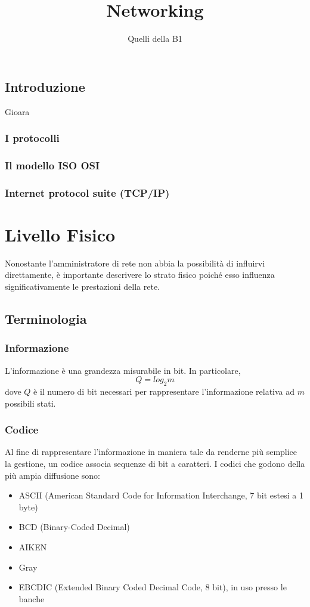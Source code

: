 \documentclass[a4paper,11pt]{paper}
\author{Quelli della B1}
\title{Networking}
\begin{document}
\maketitle
\newpage
\tableofcontents
\newpage

\subsection{Introduzione}
Gioara
\subsubsection{I protocolli}
\subsubsection{Il modello ISO OSI}
\subsubsection{Internet protocol suite (TCP/IP)}

\newpage

\section{Livello Fisico}
Nonostante l'amministratore di rete non abbia la possibilità di influirvi direttamente, è importante descrivere lo strato fisico poiché esso influenza significativamente le prestazioni della rete.
\subsection{Terminologia}
\subsubsection{Informazione} 
L'informazione è una grandezza misurabile in bit. In particolare, \[Q=log_{2}m\] dove $Q$ è il numero di bit necessari per rappresentare l'informazione relativa ad $m$ possibili stati. 

\subsubsection{Codice}
Al fine di rappresentare l'informazione in maniera tale da renderne più semplice la gestione, un codice associa sequenze di bit a caratteri. I codici che godono della più ampia diffusione sono:
\begin{itemize}
\item ASCII (American Standard Code for Information Interchange, 7 bit estesi a 1 byte)
\item BCD (Binary-Coded Decimal)
\item AIKEN 
\item Gray
\item EBCDIC (Extended Binary Coded Decimal Code, 8 bit), in uso presso le banche
\end{itemize}
\end{document}
